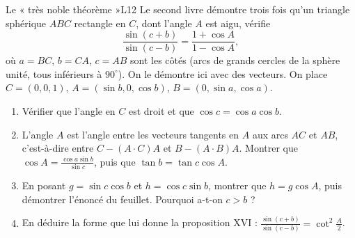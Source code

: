 \documentclass[11pt,a4paper]{article}
\begin{document}
\begin{exercice}{Le « très noble théorème »}{L1}{2}
Le second livre démontre trois fois qu'un triangle sphérique $ABC$ rectangle en
$C$, dont l'angle $A$ est aigu, vérifie
\[
\frac{\sin(c+b)}{\sin(c-b)} = \frac{1 + \cos A}{1 - \cos A},
\]
où $a = BC$, $b = CA$, $c = AB$ sont les côtés (arcs de grands cercles de la
sphère unité, tous inférieurs à $90^\circ$). On le démontre ici avec des vecteurs.
On place $C = (0,0,1)$, $A = (\sin b, 0, \cos b)$, $B = (0, \sin a, \cos a)$.


\begin{enumerate}
\item Vérifier que l'angle en $C$ est droit et que $\cos c = \cos a \cos b$.
\item L'angle $A$ est l'angle entre les vecteurs tangents en $A$ aux arcs $AC$ et
  $AB$, c'est-à-dire entre $C - (A\cdot C)A$ et $B - (A\cdot B)A$. Montrer que
  $\cos A = \frac{\cos a \sin b}{\sin c}$, puis que $\tan b = \tan c \cos A$.
\item En posant $g = \sin c \cos b$ et $h = \cos c \sin b$, montrer que
  $h = g \cos A$, puis démontrer l'énoncé du feuillet. Pourquoi a-t-on $c > b$ ?
\item En déduire la forme que lui donne la proposition XVI :
  $\frac{\sin(c+b)}{\sin(c-b)} = \cot^2\frac{A}{2}$.
\end{enumerate}
\end{exercice}
\end{document}
